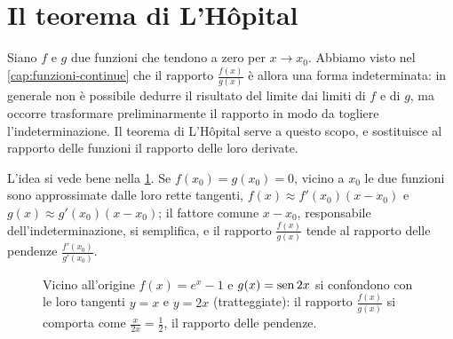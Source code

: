 \section{Il teorema di L'Hôpital}
\label{sec:hopital}

Siano $f$ e $g$ due funzioni che tendono a zero per $x\to x_{0}$. Abbiamo visto nel
\cref{cap:funzioni-continue} che il rapporto $\frac{f(x)}{g(x)}$ è allora una forma
indeterminata: in generale non è possibile dedurre il risultato del limite dai limiti
di $f$ e di $g$, ma occorre trasformare preliminarmente il rapporto in modo da togliere
l'indeterminazione. Il teorema di L'Hôpital serve a questo scopo, e sostituisce al
rapporto delle funzioni il rapporto delle loro derivate.

L'idea si vede bene nella \cref{fig:hopital-tangenti}. Se $f(x_{0})=g(x_{0})=0$, vicino a
$x_{0}$ le due funzioni sono approssimate dalle loro rette tangenti,
$f(x)\approx f'(x_{0})(x-x_{0})$ e $g(x)\approx g'(x_{0})(x-x_{0})$; il fattore comune
$x-x_{0}$, responsabile dell'indeterminazione, si semplifica, e il rapporto
$\frac{f(x)}{g(x)}$ tende al rapporto delle pendenze $\frac{f'(x_{0})}{g'(x_{0})}$.

\begin{figure}[htb]
\centering
{}
\caption{Vicino all'origine $f(x)=e^{x}-1$ e $g(x)=\operatorname{sen}2x$ si confondono con le loro
tangenti $y=x$ e $y=2x$ (tratteggiate): il rapporto $\frac{f(x)}{g(x)}$ si comporta come
$\frac{x}{2x}=\frac12$, il rapporto delle pendenze.}
\label{fig:hopital-tangenti}
\end{figure}

